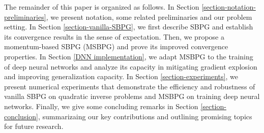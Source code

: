 \documentclass[twoside,11pt]{article}
\begin{document}
\begin{itemize}
\end{itemize}
The remainder of this paper is organized as follows. In Section \ref{section-notation-preliminaries}, we present notation, some related preliminaries and our problem setting. In Section \ref{section-vanilla-SBPG}, we first describe SBPG and establish its convergence results in the sense of expectation. Then, we propose a momentum-based SBPG (MSBPG) and prove its improved convergence properties. In Section \ref{DNN implementation}, we adapt MSBPG to the training of deep neural networks and analyze its capacity in 
{mitigating} gradient explosion and improving generalization capacity. In Section \ref{section-experiments}, we present numerical experiments that demonstrate the efficiency and robustness of vanilla SBPG on quadratic inverse problems and {MSBPG on} 
training deep neural networks. Finally, we give some concluding remarks in Section \ref{section-conclusion}, summarizaing our key contributions and outlining promising {topics} for future research.

 
\end{document}
